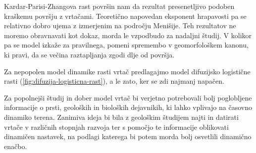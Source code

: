 \documentclass[a4paper, oneside, 12pt]{book}
\begin{document}
Kardar-Parisi-Zhangova rast površin nam da rezultat presenetljivo podoben kraškemu površju z vrtačami. Teoretično napovedan eksponent hrapavosti pa se relativno dobro ujema z izmerjenim na področju Menišije. Teh rezultatov ne moremo obravnavati kot dokaz, morda le vzpodbudo za nadaljni študij. V kolikor pa se model izkaže za pravilnega, pomeni spremembo v geomorfološkem kanonu, ki pravi, da se večina raztapljanja zgodi dlje od površja.

Za nepopolen model dinamike rasti vrtač predlagajmo model difuzijsko logistične rasti (\ref{fig:difuzija-logisticna-rast}), a le zato, ker se zdi najmanj napačen.

Za popolnejši študij in dober model vrtač bi verjetno potrebovali bolj poglobljene informacije o prsti, geoloških in bioloških dejavnikih, ki lahko vplivajo na časovno dinamiko terena. Zanimiva ideja bi bila z geološkim študijem najti in datirati vrtače v različnih stopnjah razvoja ter s pomočjo te informacije oblikovati dinamičen nastavek, na podlagi katerega bi potem morda bolj osvetlili dinamično enačbo.

            \nocite{*}
            \newpage
            {}
            


            
\end{document}
